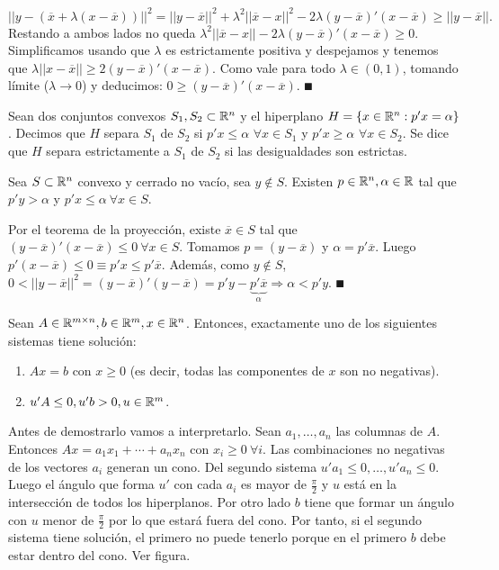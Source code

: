 \documentclass[PM.tex]{subfiles}
\begin{document}
\begin{dem}
\[
||y-(\overline{x}+\lambda(x-\overline{x}))||^2=||y-\overline{x}||^2+\lambda^2||\overline{x}-x||^2-2\lambda(y-\overline{x})'(x-\overline{x})\geq||y-\overline{x}||.
\]
Restando a ambos lados no queda $\lambda^2||\overline{x}-x||-2\lambda(y-\overline{x})'(x-\overline{x})\geq 0$. Simplificamos usando que $\lambda$ es estrictamente positiva y despejamos y tenemos que $\lambda||x-\overline{x}||\geq 2(y-\overline{x})'(x-\overline{x})$. Como vale para todo $\lambda\in (0,1)$, tomando límite ($\lambda\rightarrow 0$) y deducimos:  $0\geq (y-\overline{x})'(x-\overline{x})$. $\QED$
\end{dem}

\begin{defi} Sean dos conjuntos convexos $S_1,S_2\subset\mathbb{R}^n$ y el hiperplano $H=\{x\in\mathbb{R}^n: p'x=\alpha\}$. Decimos que $H$ separa $S_1$ de $S_2$ si $p'x\leq\alpha$ $\forall x\in S_1$ y $p'x\geq\alpha$ $\forall x\in S_2$. Se dice que $H$ separa estrictamente a $S_1$ de $S_2$ si las desigualdades son estrictas.
\end{defi}

\begin{lema}
Sea $S\subset\mathbb{R}^n$ convexo y cerrado no vacío, sea $y\not\in S$. Existen $p\in\mathbb{R}^n, \alpha\in\mathbb{R}$ tal que $p'y>\alpha$ y $p'x\leq\alpha\ \forall x\in S$.
\end{lema}
\begin{dem}
Por el teorema de la proyección, existe $\overline{x}\in S$ tal que $(y-\overline{x})'(x-\overline{x})\leq 0\ \forall x\in S$. Tomamos $p=(y-\overline{x})$ y $\alpha=p' \overline{x}$. Luego $p'(x-\overline{x})\leq 0\equiv p'x\leq p'\overline{x}$. Además, como $y\not\in S$, $0<||y-\overline{x}||^2=(y-\overline{x})'(y-\overline{x})=p'y-\underbrace{p'\overline{x}}_\alpha \Rightarrow \alpha <p'y$. $\QED$
\end{dem}

\newpage

\begin{lema}[de Farkas]
Sean $A\in \mathbb{R}^{m\times n}, b\in\mathbb{R}^m,x\in\mathbb{R}^n$. Entonces, exactamente uno de los siguientes sistemas tiene solución:
\begin{enumerate}
\item $Ax=b$ con $x\geq 0$ (es decir, todas las componentes de $x$ son no negativas).
\item $u'A\leq 0, u'b>0, u\in \mathbb{R}^m$.
\end{enumerate}
\end{lema}

Antes de demostrarlo vamos a interpretarlo. Sean $a_1,\dots, a_n$ las columnas de $A$. Entonces $Ax=a_1x_1+\cdots +a_nx_n$ con $x_i\geq 0\ \forall i$. Las combinaciones no negativas de los vectores $a_i$ generan un cono. Del segundo sistema $u'a_1\leq 0,\dots , u'a_n\leq 0$. Luego el ángulo que forma $u'$ con cada $a_i$ es mayor de $\frac{\pi}{2}$ y $u$ está en la intersección de todos los hiperplanos. Por otro lado $b$ tiene que formar un ángulo con $u$ menor de $\frac{\pi}{2}$ por lo que estará fuera del cono. Por tanto, si el segundo sistema tiene solución, el primero no puede tenerlo porque en el primero $b$ debe estar dentro del cono. Ver figura.
\end{document}
